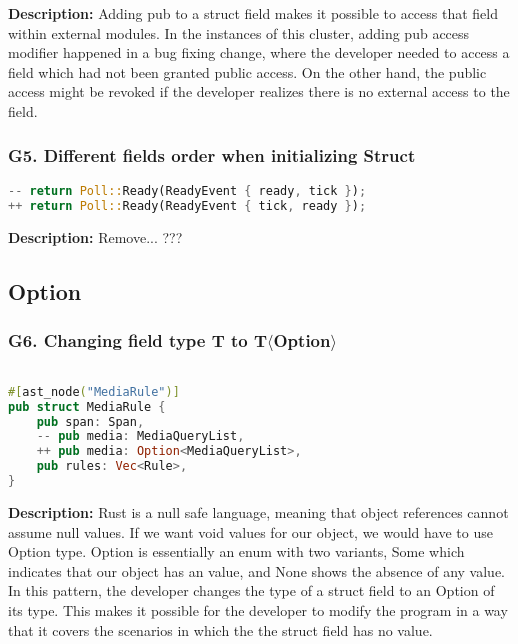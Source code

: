 \noindent \textbf{Description:} Adding pub to a struct field makes it possible to access that field within external modules. In the instances of this cluster, adding pub access modifier happened in a bug fixing change, where the developer needed to access a field which had not been granted public access. On the other hand, the public access might be revoked if the developer realizes there is no external access to the field.

\subsubsection{G5. Different fields order when initializing Struct}

\begin{lstlisting}[language=Rust, style=colouredRust, label={l3}]
-- return Poll::Ready(ReadyEvent { ready, tick });
++ return Poll::Ready(ReadyEvent { tick, ready });

\end{lstlisting}

\noindent \textbf{Description:} Remove... ???

\subsection{Option}
\subsubsection{G6. Changing field type T to T$\langle$Option$\rangle$}

\begin{lstlisting}[language=Rust, style=colouredRust, label={l3}]

#[ast_node("MediaRule")]
pub struct MediaRule {
    pub span: Span,
    -- pub media: MediaQueryList,
    ++ pub media: Option<MediaQueryList>,
    pub rules: Vec<Rule>,
}

\end{lstlisting}

\noindent \textbf{Description:} Rust is a null safe language, meaning that object references cannot assume null values. If we want void values for our object, we would have to use Option type. Option is essentially an enum with two variants, Some which indicates that our object has an value, and None shows the absence of any value. In this pattern, the developer changes the type of a struct field to an Option of its type. This makes it possible for the developer to modify the program in a way that it covers the scenarios in which the the struct field has no value.

